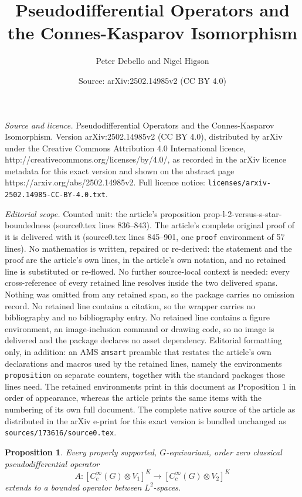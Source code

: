 \documentclass[10pt,a4paper]{amsart}
\title{Pseudodifferential Operators and the Connes-Kasparov Isomorphism}
\author{Peter Debello and Nigel Higson}
\date{Source: arXiv:2502.14985v2 (CC BY 4.0)}
\newtheorem{proposition}{Proposition}
\begin{document}
\maketitle

\noindent\emph{Source and licence.} Pseudodifferential Operators and the Connes-Kasparov Isomorphism. Version arXiv:2502.14985v2 (CC BY 4.0), distributed by arXiv under the Creative Commons Attribution 4.0 International licence, http://creativecommons.org/licenses/by/4.0/, as recorded in the arXiv licence metadata for this exact version and shown on the abstract page https://arxiv.org/abs/2502.14985v2. Full licence notice: \texttt{licenses/arxiv-2502.14985-CC-BY-4.0.txt}.\par\smallskip

\noindent\textit{Editorial scope.} Counted unit: the article's proposition prop-l-2-versus-s-star-boundedness (source0.tex lines 836--843). The article's complete original proof of it is delivered with it (source0.tex lines 845--901, one \texttt{proof} environment of 57 lines). No mathematics is written, repaired or re-derived: the statement and the proof are the article's own lines, in the article's own notation, and no retained line is substituted or re-flowed.  No further source-local context is needed: every cross-reference of every retained line resolves inside the two delivered spans.  Nothing was omitted from any retained span, so the package carries no omission record.  No retained line contains a citation, so the wrapper carries no bibliography and no bibliography entry.  No retained line contains a figure environment, an image-inclusion command or drawing code, so no image is delivered and the package declares no asset dependency.  Editorial formatting only, in addition: an AMS \texttt{amsart} preamble that restates the article's own declarations and macros used by the retained lines, namely the environments \texttt{proposition} on separate counters, together with the standard packages those lines need.  The retained environments print in this document as Proposition 1 in order of appearance, whereas the article prints the same items with the numbering of its own full document.  The complete native source of the article as distributed in the arXiv e-print for this exact version is bundled unchanged as \texttt{sources/173616/source0.tex}.
\begin{proposition}
\label{prop-l-2-versus-s-star-boundedness}
  Every  properly supported, $G$-equivariant, order zero classical pseudodifferential operator 
\[
A \colon [C_c^\infty ( G)\otimes V_1]^K \longrightarrow  [C_c^\infty ( G)\otimes V_2]^K 
\]
extends to a bounded operator between $L^2$-spaces.
\end{proposition}
\end{document}
